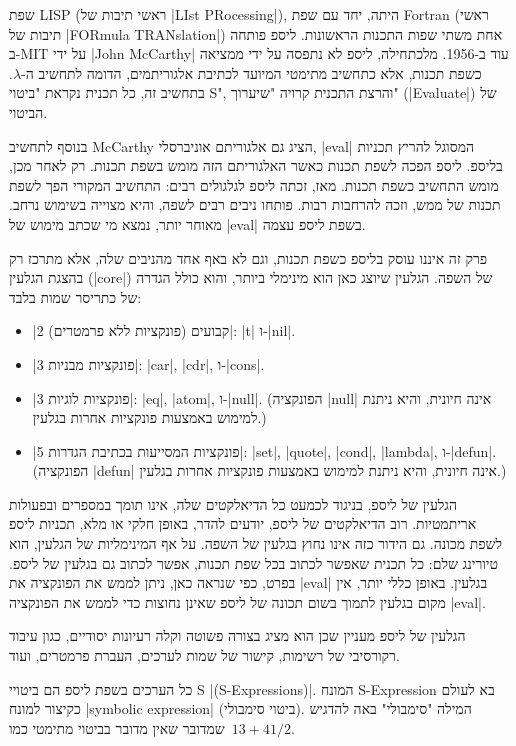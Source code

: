 שפת LISP (ראשי תיבות של \E|LIst PRocessing|), היתה, יחד עם שפת Fortran (ראשי
תיבות של \E|FORmula TRANslation|) אחת משתי שפות התכנות הראשונות. ליספ פותחה
ב-MIT על ידי \E|John McCarthy| עוד ב-1956. מלכתחילה, ליספ לא נתפסה על ידי
ממציאה כשפת תכנות, אלא כתחשיב מתימטי המיועד לכתיבת אלגוריתמים, הדומה לתחשיב
ה-$λ$.  בתחשיב זה, כל תכנית נקראת "ביטוי S", והרצת התכנית קרויה "שיערוך"
(\E|Evaluate|) של הביטוי. 

בנוסף לתחשיב McCarthy הציג גם אלגוריתם אוניברסלי, \E|eval| המסוגל להריץ תכניות
בליספ.  ליספ הפכה לשפת תכנות כאשר האלגוריתם הזה מומש בשפת תכנות.  רק לאחר מכן,
מומש התחשיב כשפת תכנות.  מאז, זכתה ליספ לגלגולים רבים: התחשיב המקורי הפך לשפת
תכנות של ממש, וזכה להרחבות רבות. פותחו ניבים רבים לשפה, והיא מצוייה בשימוש
נרחב.  מאוחר יותר, נמצא מי שכתב מימוש של \E|eval| בשפת ליספ עצמה.

פרק זה איננו עוסק בליספ כשפת תכנות, וגם לא באף אחד מהניבים שלה, אלא  מתרכז רק
בהצגת הגלעין (\E|core|) של השפה. הגלעין שיוצג כאן הוא מינימלי ביותר, 
והוא כולל הגדרה של כתריסר שמות בלבד: 
\begin{itemize}
  \item \ע|2 קבועים (פונקציות ללא פרמטרים)|: \E|t| ו-\E|nil|. 
  \item \ע|3 פונקציות מבניות|: \E|car|, \E|cdr|, ו-\E|cons|. 
  \item \ע|3 פונקציות לוגיות|: \E|eq|, \E|atom|, ו-\E|null|. 
    (הפונקציה \E|null| אינה חיונית, והיא ניתנת למימוש באמצעות פונקציות אחרות
    בגלעין.)
  \item \ע|5 פונקציות המסייעות בכתיבת הגדרות|: 
\E|set|, \E|quote|, \E|cond|, \E|lambda|, ו-\E|defun|.
(הפונקציה \E|defun| אינה חיונית, והיא ניתנת למימוש באמצעות פונקציות אחרות
בגלעין.) 
\end{itemize}

הגלעין של ליספ, בניגוד לכמעט כל הדיאלקטים שלה, אינו תומך במספרים ובפעולות
אריתמטיות. רוב הדיאלקטים של ליספ, יודעים להדר, באופן חלקי או מלא, תכניות ליספ
לשפת מכונה. גם הידור כזה אינו נחוץ בגלעין של השפה. על אף המינימליות של הגלעין,
הוא טיורינג שלם: כל תכנית שאפשר לכתוב בכל שפת תכנות, אפשר לכתוב גם בגלעין של
ליספ. בפרט, כפי שנראה כאן, ניתן לממש את הפונקציה את \E|eval| בגלעין.  באופן
כללי יותר, אין מקום בגלעין לתמוך בשום תכונה של ליספ שאינן נחוצות כדי לממש את
הפונקציה \E|eval|. 

הגלעין של ליספ מעניין שכן הוא מציג בצורה פשוטה וקלה רעיונות יסודיים, כגון עיבוד
רקורסיבי של רשימות, קישור של שמות לערכים, העברת פרמטרים, ועוד.

כל הערכים בשפת ליספ הם ביטויי S \E|(S-Expressions)|.  המונח S-Expression בא
לעולם כקיצור למונח \E|symbolic expression| (ביטוי סימבולי). המילה "סימבולי" באה
להדגיש שמדובר שאין מדובר בביטוי מתימטי
כמו~$13+41/2$.  

